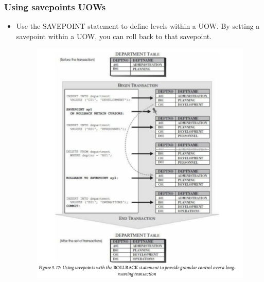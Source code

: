\documentclass{article}
\begin{document}
\subsubsection{Using savepoints UOWs}
\begin{itemize}
\item Use the SAVEPOINT statement to define levels within a UOW. By setting a savepoint within a UOW,
you can roll back to that savepoint.
\begin{figure}[H]
\centering
\includegraphics[scale=0.4]{savepoint.png}
\end{figure}
\end{itemize}
\end{document}
